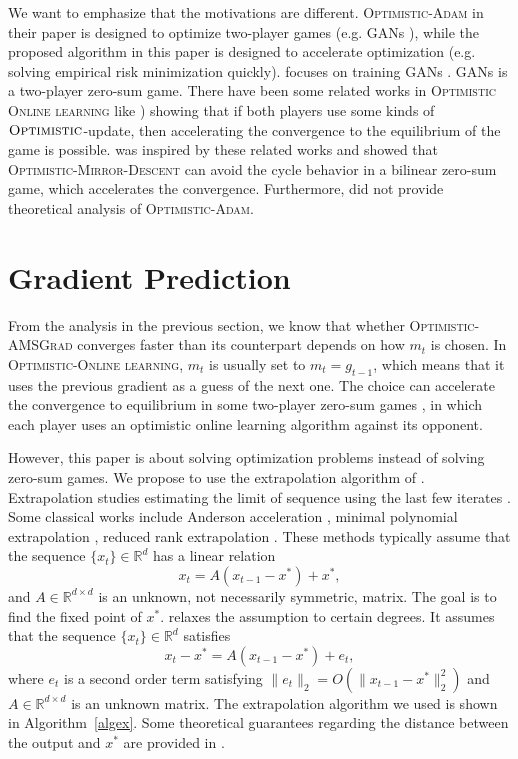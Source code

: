 \documentclass[11pt]{article}
\theoremstyle{k}
\begin{document}
We want to emphasize that the motivations are different. \textsc{Optimistic-Adam} in their paper is designed to optimize two-player games (e.g. GANs \cite{goodfellow2014generative}),
while the proposed algorithm in this paper is designed to accelerate optimization
(e.g. solving empirical risk minimization quickly).
\cite{DISZ18} focuses on training GANs \cite{goodfellow2014generative}. GANs is a two-player zero-sum game. There have been some related works in \textsc{Optimistic Online learning} like \cite{CJ12,RS13,SALS15})
showing that if both players use some kinds of $\textsc{Optimistic}$-update,
then accelerating the convergence to the equilibrium of the game is possible.
\cite{DISZ18} was inspired by these related works and showed that \textsc{Optimistic-Mirror-Descent}
can avoid the cycle behavior in a bilinear zero-sum game, which accelerates the convergence. Furthermore, \cite{DISZ18} did not provide theoretical analysis of \textsc{Optimistic-Adam}.

\section{Gradient Prediction} \label{sec:predict_m}

From the analysis in the previous section, we know that whether \textsc{Optimistic-AMSGrad} converges faster than its counterpart depends on how $m_{t}$ is chosen.
In \textsc{Optimistic-Online learning}, $m_{t}$ is usually set to $m_{t}= g_{t-1}$, which means that it uses the previous gradient as a guess of the next one.
The choice can accelerate the convergence to equilibrium in some two-player zero-sum games \cite{RS13,SALS15,DISZ18}, in which each player uses an optimistic online learning algorithm against its opponent.

However, this paper is about solving optimization problems instead of solving zero-sum games. 
We propose to use the extrapolation algorithm of \cite{SAB16}.
Extrapolation studies estimating the limit of sequence using the last few iterates
\cite{BZ13}. 
Some classical works include Anderson acceleration \cite{WN11}, minimal polynomial extrapolation \cite{CJ76}, reduced rank extrapolation \cite{E79}.
These methods typically assume that the sequence $\{x_t\} \in \mathbb R^d$
has a linear relation
\begin{equation} \label{vvv}
x_t = A( x_{t-1} - x^* ) + x^*,
\end{equation}
and $A \in \mathbb R^{d \times d}$ is an unknown, not necessarily symmetric, matrix.
The goal is to find the fixed point of $x^{*}$.
\cite{SAB16} relaxes the assumption to certain degrees.
It assumes that the sequence $\{x_t\} \in \mathbb R^d$ satisfies
\begin{equation} \label{nox}
x_t - x^* = A( x_{t-1} - x^* ) + e_t,
\end{equation}
where $e_t$ is a second order term satisfying $\| e_t \|_2  = O( \| x_{t-1} - x^* \|_2^2)$
and $A \in \mathbb R^{d \times d}$ is an unknown matrix.
The extrapolation algorithm we used is shown in Algorithm~\ref{algex}.
Some theoretical guarantees regarding the distance between the output and $x^*$ are provided in \cite{SAB16}.
\end{document}
